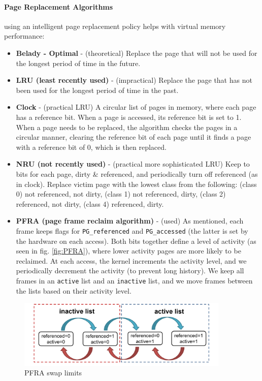 \documentclass[openany,12pt]{book}
\newcommand{\code}[1]{\texttt{#1}}
\begin{document}
\paragraph{Page Replacement Algorithms} using an intelligent page replacement policy helps with virtual memory performance:
\begin{itemize}
  \item \textbf{Belady - Optimal} - (theoretical) Replace the page that will not be used for the longest period of time in the future. 

  \item \textbf{LRU (least recently used)} - (impractical) Replace the page that has not been used for the longest period of time in the past. 

  \item \textbf{Clock} - (practical LRU) A circular list of pages in memory, where each page has a reference bit. When a page is accessed, its reference bit is set to 1. When a page needs to be replaced, the algorithm checks the pages in a circular manner, clearing the reference bit of each page until it finds a page with a reference bit of 0, which is then replaced.

  \item \textbf{NRU (not recently used)} - (practical more sophisticated LRU) Keep to bits for each page, dirty \& referenced, and periodically turn off referenced (as in clock). Replace victim page with the lowest class from the following: (class 0) not referenced, not dirty, (class 1) not referenced, dirty, (class 2) referenced, not dirty, (class 4) referenced, dirty. 

  \item \textbf{PFRA (page frame reclaim algorithm)} - (used) As mentioned, each frame keeps flags for \code{PG\_referenced} and \code{PG\_accessed} (the latter is set by the hardware on each access). Both bits together define a level of activity (as seen in fig. \ref{fig:PFRA}), where lower activity pages are more likely to be reclaimed. At each access, the kernel increments the activity level, and we periodically decrement the activity (to prevent long history). We keep all frames in an \code{active} list and an \code{inactive} list, and we move frames between the lists based on their activity level.

\end{itemize}


\begin{figure}[H]
  \centering
  \includegraphics[width=0.9\textwidth]{PFRA-Lists.png}
  \caption{PFRA swap limits}
  \label{fig:PFRA-lists}
\end{figure}
\end{document}
